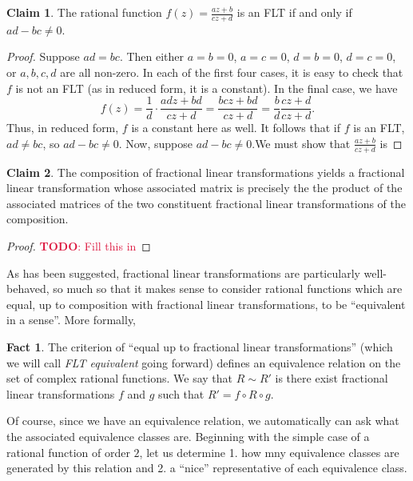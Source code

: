 \documentclass[aps,pra,showpacs,notitlepage,onecolumn,superscriptaddress,nofootinbib]{revtex4-1}
\newcommand{\pop}[1]{\textcolor{crimson}{#1}}
\theoremstyle{definition}
\newtheorem{fact}{Fact}[section]
\newtheorem{claim}{Claim}[section]
\newcommand{\hhrulefill}{\hspace{-1.5em} \hrulefill}
\begin{document}
\begin{claim}
  The rational function $f(z) = \frac{az + b}{cz + d}$ is an FLT if and only if $ad - bc \neq 0$.
\end{claim}
\begin{proof}
  Suppose $ad = bc$. Then either $a = b = 0$, $a = c = 0$, $d = b = 0$, $d = c = 0$, or $a, b, c, d$ are all non-zero. In each of the first four cases, it is easy to check that $f$ is not an FLT (as in reduced form, it is a constant).
  In the final case, we have
  \begin{equation}
   f(z) = \frac{1}{d} \cdot \frac{adz + bd}{cz + d} = \frac{bcz + bd}{cz + d} = \frac{b}{d} \frac{cz + d}{cz + d}.
  \end{equation}
  Thus, in reduced form, $f$ is a constant here as well. It follows that if $f$ is an FLT, $ad \neq bc$, so $ad - bc \neq 0$. Now, suppose $ad - bc \neq 0$.We must show that $\frac{az + b}{cz + d}$ is
  \end{proof}

\begin{claim}
  The composition of fractional linear transformations yields a fractional linear transformation whose associated matrix is precisely the the product of the associated matrices of the two
  constituent fractional linear transformations of the composition.
\end{claim}

\begin{proof}
  \pop{\textbf{TODO}: Fill this in}
  \end{proof}

\hhrulefill

\noindent As has been suggested, fractional linear transformations are particularly well-behaved, so much so that it makes sense to consider rational functions which are equal,
up to composition with fractional linear transformations, to be ``equivalent in a sense''. More formally,

\begin{fact}
  The criterion of ``equal up to fractional linear transformations'' (which we will call \emph{FLT equivalent} going forward) defines an equivalence relation on the set of complex rational functions. We say that $R \sim R'$ is there
  exist fractional linear transformations $f$ and $g$ such that $R' = f \circ R \circ g$.
 \end{fact}

\noindent Of course, since we have an equivalence relation, we automatically can ask what the associated equivalence classes are. Beginning with the simple case of a rational function of order $2$, let us determine 1. how
mny equivalence classes are generated by this relation and 2. a ``nice'' representative of each equivalence class.
\end{document}
